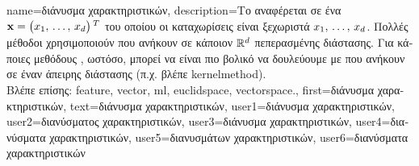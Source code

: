 {name={\foreignlanguage{greek}{διάνυσμα χαρακτηριστικών}},
	description={\foreignlanguage{greek}{Το}  
		 \foreignlanguage{greek}{αναφέρεται σε ένα}  ${\bf x} = \big(x_{1}, \,\ldots, \,x_{d}\big)\,^{T}$ 
		\foreignlanguage{greek}{του οποίου οι καταχωρίσεις είναι ξεχωριστά}  $x_{1}, \,\ldots, \,x_{d}$. 
		\foreignlanguage{greek}{Πολλές μέθοδοι}  \foreignlanguage{greek}{χρησιμοποιούν}  
		 \foreignlanguage{greek}{που ανήκουν σε κάποιον}  $\mathbb{R}^{d}$
		\foreignlanguage{greek}{πεπερασμένης διάστασης. Για κάποιες μεθόδους} , \foreignlanguage{greek}{ωστόσο, 
		μπορεί να είναι πιο βολικό να δουλεύουμε με}   \foreignlanguage{greek}{που ανήκουν σε 
		έναν}  \foreignlanguage{greek}{άπειρης διάστασης (π.χ. βλέπε} \gls{kernelmethod}).\\
		\foreignlanguage{greek}{Βλέπε επίσης:} \gls{feature}, \gls{vector}, \gls{ml}, \gls{euclidspace}, \gls{vectorspace}.}, 
	first={\foreignlanguage{greek}{διάνυσμα χαρακτηριστικών}},
	text={\foreignlanguage{greek}{διάνυσμα χαρακτηριστικών}},
	user1={\foreignlanguage{greek}{διάνυσμα χαρακτηριστικών}}, %
  	user2={\foreignlanguage{greek}{διανύσματος χαρακτηριστικών}}, %
	user3={\foreignlanguage{greek}{διάνυσμα χαρακτηριστικών}}, %
	user4={\foreignlanguage{greek}{διανύσματα χαρακτηριστικών}}, %
  	user5={\foreignlanguage{greek}{διανυσμάτων χαρακτηριστικών}}, %
	user6={\foreignlanguage{greek}{διανύσματα χαρακτηριστικών}} %
}

